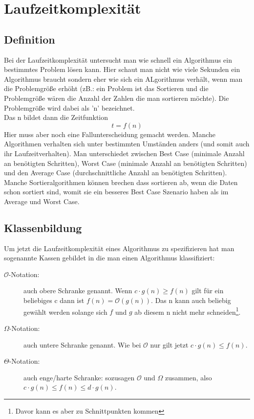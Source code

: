 \documentclass[a4paper]{scrartcl}
\begin{document}
    \section{Laufzeitkomplexität}
        \subsection{Definition}
        Bei der Laufzeitkomplexität untersucht man wie schnell ein Algorithmus ein bestimmtes Problem lösen kann. Hier schaut man nicht wie viele Sekunden ein Algorithmus braucht sondern eher
        wie sich ein ALgorithmus verhält, wenn man die Problemgröße erhöht (zB.: ein Problem ist das Sortieren und die Problemgröße wären die Anzahl der Zahlen die man sortieren möchte).
        Die Problemgröße wird dabei als 'n' bezeichnet. \\
        Das n bildet dann die Zeitfunktion
        \begin{equation}
            t = f(n)
        \end{equation} 
        Hier muss aber noch eine Fallunterscheidung gemacht werden. Manche Algorithmen verhalten sich unter bestimmten Umständen anders (und somit auch ihr Laufzeitverhalten). Man unterschiedet 
        zwischen Best Case (minimale Anzahl an benötigten Schritten), Worst Case (minimale Anzahl an benötigten Schritten) und den Average Case (durchschnittliche Anzahl an benötigten Schritten).
        Manche Sortieralgorithmen können brechen dass sortieren ab, wenn die Daten schon sortiert sind, womit sie ein besseres Best Case Szenario haben als im Average und Worst Case. 
        \subsection{Klassenbildung}
        Um jetzt die Laufzeitkomplexität eines Algorithmus zu spezifizieren hat man sogenannte Kassen gebildet in die man einen Algorithmus klassifiziert:
        \begin{description}
            \item[\(\mathcal{O}\)-Notation:] auch obere Schranke genannt. Wenn \( c \cdot g(n) \ge f(n) \) gilt für ein beliebiges c dann ist \(f(n) = \mathcal{O}(g(n))\). Das 
                n kann auch beliebig gewählt werden solange sich \(f\) und \(g\) ab diesem n nicht mehr schneiden\footnote{Davor kann es aber zu Schnittpunkten kommen}.
            \item[\(\Omega\)-Notation:] auch untere Schranke genannt. Wie bei \(\mathcal{O}\) nur gilt jetzt \( c \cdot g(n) \le f(n) \).
            \item[\(\Theta\)-Notation:] auch enge/harte Schranke: sozusagen \(\mathcal{O}\) und \(\Omega\) zusammen, also   \( c \cdot g(n) \le f(n) \le d \cdot g(n) \).  
        \end{description}
\end{document}
